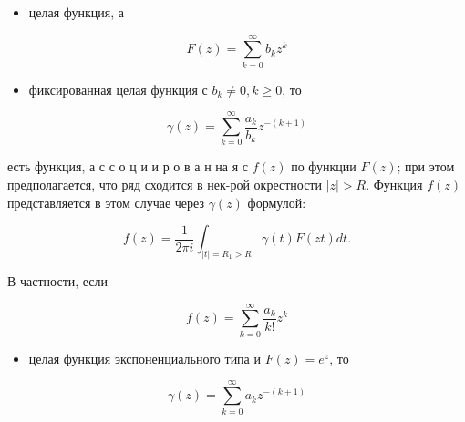 \documentclass[10pt]{article}
\begin{document}
\begin{itemize}

  \item целая функция, а

\end{itemize}



\[

F(z)=\sum_{k=0}^{\infty} b_{k} z^{k}

\]



\begin{itemize}

  \item фиксированная целая функция с $b_{k} \neq 0, k \geqslant 0$, то

\end{itemize}



\[

\gamma(z)=\sum_{k=0}^{\infty} \frac{a_{k}}{b_{k}} z^{-(k+1)}

\]



есть функция, а с с о ц и и р о в а н на я с $f(z)$ по функции $F(z)$; при этом предполагается, что ряд сходится в нек-рой окрестности $|z|>R$. Функция $f(z)$ представляется в этом случае через $\gamma(z)$ формулой:



\[

f(z)=\frac{1}{2 \pi i} \int_{|t|=R_{1}>R} \gamma(t) F(z t) d t .

\]



В частности, если



\[

f(z)=\sum_{k=0}^{\infty} \frac{a_{k}}{k !} z^{k}

\]



\begin{itemize}

  \item целая функция экспоненциального типа и $F(z)=e^{z}$, то

\end{itemize}



\[

\gamma(z)=\sum_{k=0}^{\infty} a_{k} z^{-(k+1)}

\]
\end{document}
